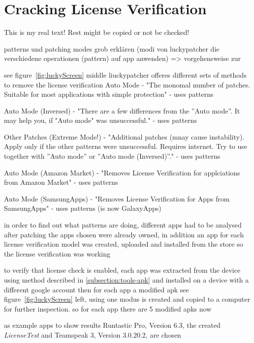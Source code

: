 \section{Cracking License Verification} \label{section:luckypatcher-modi}
This is my real text! Rest might be copied or not be checked!



%
patterns und patching modes grob erklären (modi von luckypatcher die verschiedene operationen (pattern) auf app anwenden) => vorgehensweise zur\newline

see figure~\ref{fig:luckyScreen} middle liuckypatcher offeres different sets of methods to remove the license verification
Auto Mode - "The monomal number of patches. Suitable for most applications with simple protection" - uses patterns

Auto Mode (Inversed) - "There are a few differences from the ”Auto mode”. It may help you, if "Auto mode" was unsuccessful." - uses patterns

Other Patches (Extreme Mode!) - "Additional patches (mnay cause instability). Apply only if the other patterns were unsuccessful. Requires internet. Try to use together with ”Auto mode” or ”Auto mode (Inversed)”." - uses patterns

Auto Mode (Amazon Market) - "Removes License Verification for applciations from Amazon Market" - uses patterns

Auto Mode (SamsungApps) - "Removes License Verification for Apps from SamsungApps" - uses patterns  (is now GalaxyApps)


in order to find out what patterns are doing, different apps had to be analysed after patching
the apps chosen were already owned, in addition an app for each license verification model was created, uploaded and installed from the store so the license verification was working

to verify that license check is enabled, each app was extracted from the device using method described in \ref{subsection:tools-apk} and installed on a device with a different google account
then for each app a modified apk see figure~\ref{fig:luckyScreen} left, using one modus is created and copied to a computer for further inspection. so for each app there are 5 modified apks now


as example apps to show results Runtastic Pro\cite{runtasticApp}, Version 6.3, the created \textit{LicenseTest} and Teamspeak 3\cite{teamspeakApp}, Version 3.0.20.2, are chosen

